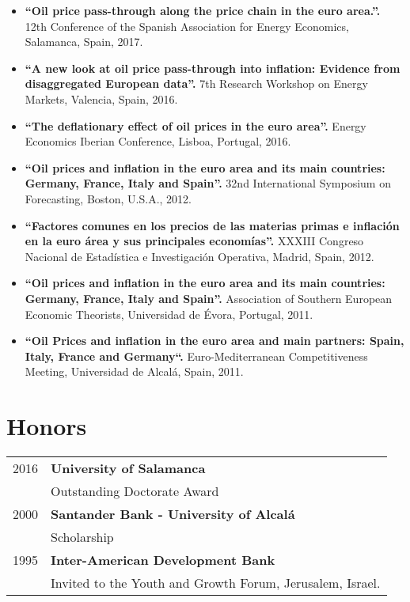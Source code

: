 \documentclass[11pt]{article}\usepackage[]{graphicx}\usepackage[]{color}
\begin{document}
\begin{itemize}

\item \textbf{``Oil price pass-through along the price chain in the euro area.''.} 12th Conference of the Spanish Association for Energy Economics, Salamanca, Spain, 2017.

\item \textbf{``A new look at oil price pass-through into inflation: Evidence from disaggregated European data''.} 7th Research Workshop on Energy Markets, Valencia, Spain, 2016.

\item \textbf{``The deflationary effect of oil prices in the euro area''.} Energy Economics Iberian Conference, Lisboa, Portugal, 2016.

\item \textbf{``Oil prices and inflation in the euro area and its main countries: Germany, France, Italy and Spain''.} 32nd International Symposium on Forecasting, Boston, U.S.A., 2012.

\item \textbf{``Factores comunes en los precios de las materias primas e inflación en la euro área y sus principales economías''.} XXXIII Congreso Nacional de Estadística e Investigación Operativa, Madrid, Spain, 2012.

\item \textbf{``Oil prices and inflation in the euro area and its main countries: Germany, France, Italy and Spain''.} Association of Southern European Economic Theorists, Universidad de Évora, Portugal, 2011.

\item \textbf{``Oil Prices and inflation in the euro area and main partners: Spain, Italy, France and Germany``.} Euro-Mediterranean Competitiveness Meeting, Universidad de Alcalá, Spain, 2011.

\end{itemize}


\section{Honors} 

\begin{tabular}{rl}

2016   & \textbf{University of Salamanca}\\
& Outstanding Doctorate Award\\

2000	 & \textbf{Santander Bank - University of Alcalá}\\
&  Scholarship\\

1995 & \textbf{Inter-American Development Bank}\\
& Invited to the Youth and Growth Forum, Jerusalem, Israel.

\end{tabular}
\end{document}
